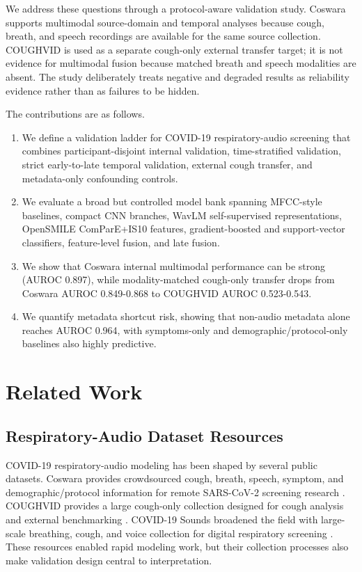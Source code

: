 \documentclass[journal]{IEEEtran}
\begin{document}
We address these questions through a protocol-aware validation study. Coswara supports multimodal source-domain and temporal analyses because cough, breath, and speech recordings are available for the same source collection. COUGHVID is used as a separate cough-only external transfer target; it is not evidence for multimodal fusion because matched breath and speech modalities are absent. The study deliberately treats negative and degraded results as reliability evidence rather than as failures to be hidden.

The contributions are as follows.
\begin{enumerate}
\item We define a validation ladder for COVID-19 respiratory-audio screening that combines participant-disjoint internal validation, time-stratified validation, strict early-to-late temporal validation, external cough transfer, and metadata-only confounding controls.
\item We evaluate a broad but controlled model bank spanning MFCC-style baselines, compact CNN branches, WavLM self-supervised representations, OpenSMILE ComParE+IS10 features, gradient-boosted and support-vector classifiers, feature-level fusion, and late fusion.
\item We show that Coswara internal multimodal performance can be strong (AUROC 0.897), while modality-matched cough-only transfer drops from Coswara AUROC 0.849-0.868 to COUGHVID AUROC 0.523-0.543.
\item We quantify metadata shortcut risk, showing that non-audio metadata alone reaches AUROC 0.964, with symptoms-only and demographic/protocol-only baselines also highly predictive.
\end{enumerate}

\section{Related Work}
\subsection{Respiratory-Audio Dataset Resources}
COVID-19 respiratory-audio modeling has been shaped by several public datasets. Coswara provides crowdsourced cough, breath, speech, symptom, and demographic/protocol information for remote SARS-CoV-2 screening research \cite{bhattacharya2023coswara}. COUGHVID provides a large cough-only collection designed for cough analysis and external benchmarking \cite{orlandic2021coughvid}. COVID-19 Sounds broadened the field with large-scale breathing, cough, and voice collection for digital respiratory screening \cite{xia2021covid}. These resources enabled rapid modeling work, but their collection processes also make validation design central to interpretation.
\end{document}
